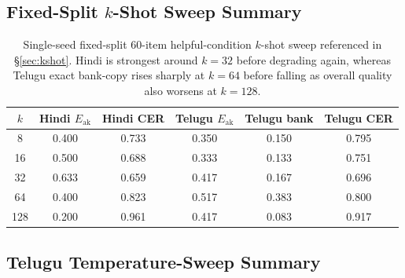 \documentclass{article}
\begin{document}
\clearpage
{}
\subsection{Fixed-Split $k$-Shot Sweep Summary}\label{app:kshot}

\begin{table}[H]
\centering
\small
\setlength{\tabcolsep}{8pt}
\begin{tabular}{cccccc}
\toprule
\textbf{$k$} & \textbf{Hindi $E_{\mathrm{ak}}$} & \textbf{Hindi CER} & \textbf{Telugu $E_{\mathrm{ak}}$} & \textbf{Telugu bank} & \textbf{Telugu CER} \\
\midrule
8   & 0.400 & 0.733 & 0.350 & 0.150 & 0.795 \\
16  & 0.500 & 0.688 & 0.333 & 0.133 & 0.751 \\
32  & 0.633 & 0.659 & 0.417 & 0.167 & 0.696 \\
64  & 0.400 & 0.823 & 0.517 & 0.383 & 0.800 \\
128 & 0.200 & 0.961 & 0.417 & 0.083 & 0.917 \\
\bottomrule
\end{tabular}
\caption{Single-seed fixed-split 60-item helpful-condition $k$-shot sweep referenced in \S\ref{sec:kshot}. Hindi is strongest around $k{=}32$ before degrading again, whereas Telugu exact bank-copy rises sharply at $k{=}64$ before falling as overall quality also worsens at $k{=}128$.}
\label{tab:kshot}
\end{table}

\subsection{Telugu Temperature-Sweep Summary}\label{app:tempsweep}
\end{document}
